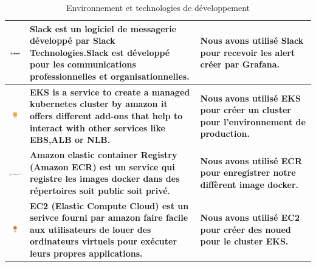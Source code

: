   \begin{center}
    \begin{table}[H]  
      \centering
  \begin{tabular}{|m{5cm}|m{5cm}|m{5cm}|}
  \hline
\centering\includegraphics[width=4cm,valign=c]{autre_partie/Slack_RGB.png}& \textbf{Slack est un logiciel de messagerie développé par Slack Technologies.Slack est développé pour les communications professionnelles et organisationnelles. } & \textbf{Nous avons utilisé Slack pour recevoir les alert créer par Grafana.}  \\
\hline
\centering\includegraphics[width=4cm,valign=c]{autre_partie/EKS.png}& \textbf{EKS is a service to create a managed kubernetes cluster by amazon it offers different add-ons that help to interact with other services like EBS,ALB or NLB. } & \textbf{Nous avons utilisé EKS pour créer un cluster pour l'environnement de production.}  \\
\hline
\centering\includegraphics[width=3cm,valign=c]{autre_partie/ECR.png}& \textbf{Amazon elastic container Registry (Amazon ECR) est un service qui registre les images docker dans des répertoires soit public soit privé. } & \textbf{Nous avons utilisé ECR pour enregistrer notre diffèrent image docker.}  \\
\hline
\centering\includegraphics[width=4cm,valign=c]{autre_partie/EC2.png}& \textbf{EC2 (Elastic Compute Cloud) est un serivce fourni par amazon faire facile aux utilisateurs de louer des ordinateurs virtuels pour exécuter leurs propres applications. } & \textbf{Nous avons utilisé EC2 pour créer des noued pour le cluster EKS.}  \\
\hline
\end{tabular}
\caption{Environnement et technologies de développement}
\end{table}
\end{center}
